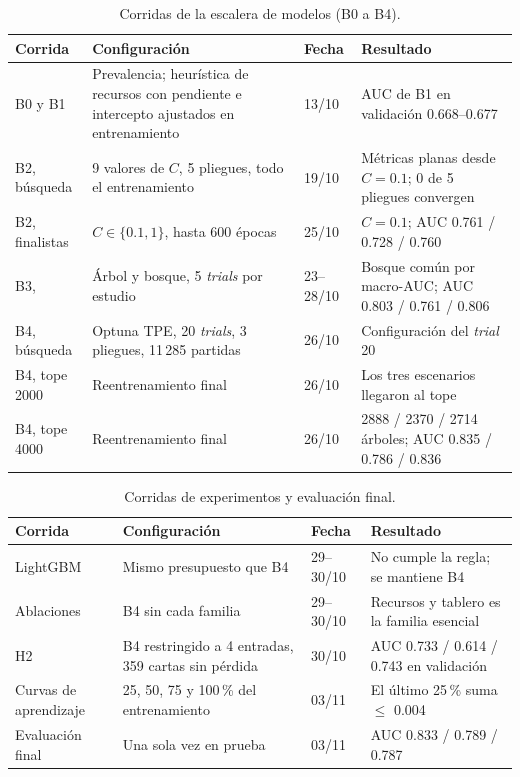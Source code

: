 \begin{table}[H]
  \centering
  \caption{Corridas de la escalera de modelos (B0 a B4).}
  \label{tab:stage2runs}
  \footnotesize
  \begin{tabularx}{\textwidth}{@{}P{3.0cm} P{4.6cm} P{1.5cm} Y@{}}
    \toprule
    \textbf{Corrida} & \textbf{Configuraci\'on} & \textbf{Fecha} & \textbf{Resultado}\\
    \midrule
    B0 y B1 & Prevalencia; heur\'istica de recursos con pendiente e intercepto ajustados en entrenamiento & 13/10 & AUC de B1 en validaci\'on 0.668--0.677\\
    B2, b\'usqueda & 9 valores de $C$, 5 pliegues, todo el entrenamiento & 19/10 & M\'etricas planas desde $C = 0.1$; 0 de 5 pliegues convergen\\
    B2, finalistas & $C \in \{0.1, 1\}$, hasta 600 \'epocas & 25/10 & $C = 0.1$; AUC 0.761 / 0.728 / 0.760\\
    B3,  & \'Arbol y bosque, 5 \textit{trials} por estudio & 23--28/10 & Bosque com\'un por macro-AUC; AUC 0.803 / 0.761 / 0.806\\
    B4, b\'usqueda & Optuna TPE, 20 \textit{trials}, 3 pliegues, 11\,285 partidas & 26/10 & Configuraci\'on del \textit{trial} 20\\
    B4, tope 2000 & Reentrenamiento final & 26/10 & Los tres escenarios llegaron al tope\\
    B4, tope 4000 & Reentrenamiento final & 26/10 & 2888 / 2370 / 2714 \'arboles; AUC 0.835 / 0.786 / 0.836\\
    \bottomrule
  \end{tabularx}
\end{table}

\begin{table}[H]
  \centering
  \caption{Corridas de experimentos y evaluaci\'on final.}
  \label{tab:stage2runs2}
  \footnotesize
  \begin{tabularx}{\textwidth}{@{}P{3.0cm} P{4.6cm} P{1.5cm} Y@{}}
    \toprule
    \textbf{Corrida} & \textbf{Configuraci\'on} & \textbf{Fecha} & \textbf{Resultado}\\
    \midrule
    LightGBM & Mismo presupuesto que B4 & 29--30/10 & No cumple la regla; se mantiene B4\\
    Ablaciones & B4 sin cada familia & 29--30/10 & Recursos y tablero es la familia esencial\\
    H2 & B4 restringido a 4 entradas, 359 cartas sin p\'erdida & 30/10 & AUC 0.733 / 0.614 / 0.743 en validaci\'on\\
    Curvas de aprendizaje & 25, 50, 75 y 100\,\% del entrenamiento & 03/11 & El \'ultimo 25\,\% suma $\le$ 0.004\\
    Evaluaci\'on final & Una sola vez en prueba & 03/11 & AUC 0.833 / 0.789 / 0.787\\
    \bottomrule
  \end{tabularx}
\end{table}


